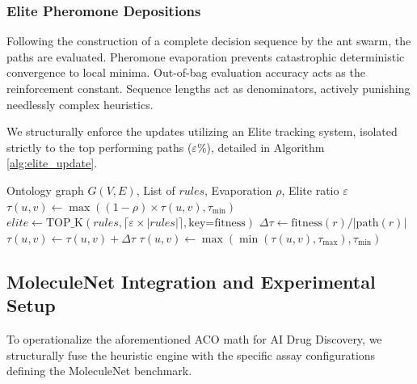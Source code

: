 \documentclass[preprint,12pt,authoryear]{elsarticle}
\begin{document}
\subsubsection{Elite Pheromone Depositions}
Following the construction of a complete decision sequence by the ant swarm, the paths are evaluated. Pheromone evaporation prevents catastrophic deterministic convergence to local minima. Out-of-bag evaluation accuracy acts as the reinforcement constant. Sequence lengths act as denominators, actively punishing needlessly complex heuristics.

We structurally enforce the updates utilizing an Elite tracking system, isolated strictly to the top performing paths ($\varepsilon\%$), detailed in Algorithm \ref{alg:elite_update}.

\begin{algorithm}[hbt!]
\caption{Algorithm 2: ELITE\_PHEROMONE\_UPDATE}
\label{alg:elite_update}
\begin{algorithmic}[1]
\REQUIRE Ontology graph $G(V, E)$, List of $rules$, Evaporation $\rho$, Elite ratio $\varepsilon$
\STATE {}
    \STATE $\tau(u,v) \leftarrow \max((1 - \rho) \times \tau(u,v), \tau_{\min})$
\ENDFOR
\STATE {}
\STATE $elite \leftarrow \text{TOP\_K}(rules, \lceil \varepsilon \times |rules| \rceil, \text{key=fitness})$
\STATE {}
    \STATE $\Delta\tau \leftarrow \text{fitness}(r) / |\text{path}(r)|$
        \STATE $\tau(u,v) \leftarrow \tau(u,v) + \Delta\tau$
    \ENDFOR
\ENDFOR
\STATE {}
    \STATE $\tau(u,v) \leftarrow \max(\min(\tau(u,v), \tau_{\max}), \tau_{\min})$
\ENDFOR
\end{algorithmic}
\end{algorithm}

\subsection{MoleculeNet Integration and Experimental Setup}
\label{subsec:exper_setup}

To operationalize the aforementioned ACO math for AI Drug Discovery, we structurally fuse the heuristic engine with the specific assay configurations defining the MoleculeNet benchmark. 
\end{document}
